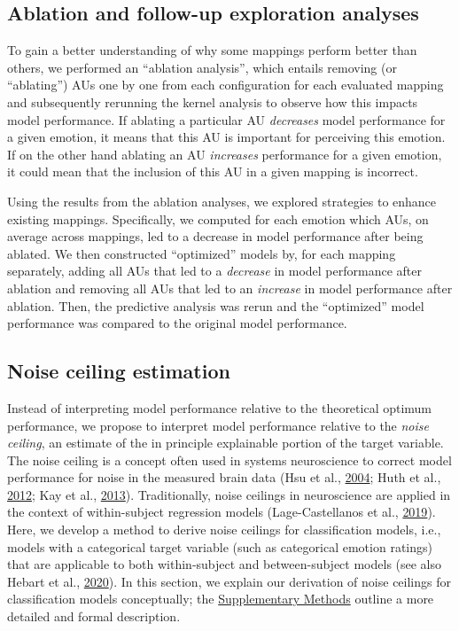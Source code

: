 \documentclass[11pt,american,a4paper,oneside,]{memoir} %
\begin{document}
\hypertarget{ablation-and-follow-up-exploration-analyses}{%
\subsection{Ablation and follow-up exploration analyses}\label{ablation-and-follow-up-exploration-analyses}}

To gain a better understanding of why some mappings perform better than others, we performed an ``ablation analysis'', which entails removing (or ``ablating'') AUs one by one from each configuration for each evaluated mapping and subsequently rerunning the kernel analysis to observe how this impacts model performance. If ablating a particular AU \emph{decreases} model performance for a given emotion, it means that this AU is important for perceiving this emotion. If on the other hand ablating an AU \emph{increases} performance for a given emotion, it could mean that the inclusion of this AU in a given mapping is incorrect.

Using the results from the ablation analyses, we explored strategies to enhance existing mappings. Specifically, we computed for each emotion which AUs, on average across mappings, led to a decrease in model performance after being ablated. We then constructed ``optimized'' models by, for each mapping separately, adding all AUs that led to a \emph{decrease} in model performance after ablation and removing all AUs that led to an \emph{increase} in model performance after ablation. Then, the predictive analysis was rerun and the ``optimized'' model performance was compared to the original model performance.

\hypertarget{hka-noise-ceiling}{%
\subsection{Noise ceiling estimation}\label{hka-noise-ceiling}}

Instead of interpreting model performance relative to the theoretical optimum performance, we propose to interpret model performance relative to the \emph{noise ceiling}, an estimate of the in principle explainable portion of the target variable. The noise ceiling is a concept often used in systems neuroscience to correct model performance for noise in the measured brain data (Hsu et al., \protect\hyperlink{ref-Hsu2004-hs}{2004}; Huth et al., \protect\hyperlink{ref-Huth2012-yc}{2012}; Kay et al., \protect\hyperlink{ref-Kay2013-ch}{2013}). Traditionally, noise ceilings in neuroscience are applied in the context of within-subject regression models (Lage-Castellanos et al., \protect\hyperlink{ref-lage2019methods}{2019}). Here, we develop a method to derive noise ceilings for classification models, i.e., models with a categorical target variable (such as categorical emotion ratings) that are applicable to both within-subject and between-subject models (see also Hebart et al., \protect\hyperlink{ref-Hebart2020-wp}{2020}). In this section, we explain our derivation of noise ceilings for classification models conceptually; the \protect\hyperlink{hypothesis-kernel-analysis-supplement}{Supplementary Methods} outline a more detailed and formal description.
\end{document}

